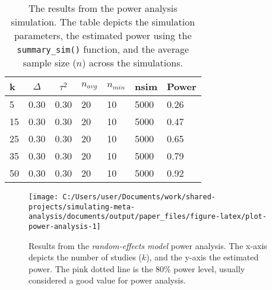 \documentclass[
  man,floatsintext]{apa6}
\begin{document}
\scriptsize

\begin{table}[H]

\begin{center}
\begin{threeparttable}

\caption{\label{tab:tab-power-analysis-example}The results from the power analysis simulation. The table depicts the simulation parameters, the estimated power using the \texttt{summary\_sim()} function, and the average sample size (\(n\)) across the simulations.}

\small{

\begin{tabular}{lllllll}
\toprule
k & \multicolumn{1}{c}{$\Delta$} & \multicolumn{1}{c}{$\tau^2$} & \multicolumn{1}{c}{$n_{avg}$} & \multicolumn{1}{c}{$n_{min}$} & \multicolumn{1}{c}{nsim} & \multicolumn{1}{c}{Power}\\
\midrule
5 & 0.30 & 0.30 & 20 & 10 & 5000 & 0.26\\
15 & 0.30 & 0.30 & 20 & 10 & 5000 & 0.47\\
25 & 0.30 & 0.30 & 20 & 10 & 5000 & 0.65\\
35 & 0.30 & 0.30 & 20 & 10 & 5000 & 0.79\\
50 & 0.30 & 0.30 & 20 & 10 & 5000 & 0.92\\
\bottomrule
\end{tabular}

}

\end{threeparttable}
\end{center}

\end{table}

\normalsize

\scriptsize

\begin{figure}[H]

{\centering \texttt{[image: C:/Users/user/Documents/work/shared-projects/simulating-meta-analysis/documents/output/paper\_files/figure-latex/plot-power-analysis-1]} 

}

\caption{Results from the \emph{random-effects model} power analysis. The x-axis depicts the number of studies (\(k\)), and the y-axis the estimated power. The pink dotted line is the 80\% power level, usually considered a good value for power analysis.}\label{fig:plot-power-analysis}
\end{figure}
\end{document}

